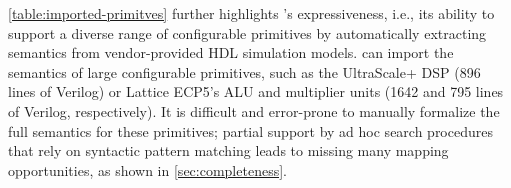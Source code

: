 \cref{table:imported-primitves} further
  highlights \lr's expressiveness,
  i.e., its ability to support a diverse
  range of configurable primitives
  by automatically extracting semantics from
  vendor-provided HDL simulation models.
\lr can import the semantics
  of large configurable primitives, 
  such as the UltraScale+ DSP (896 lines of Verilog)
  or Lattice ECP5's ALU and multiplier units (1642 and
  795 lines of Verilog, respectively).
It is difficult and error-prone
  to manually formalize the full semantics for these primitives;
  partial support by ad hoc search procedures
  that rely on syntactic pattern matching
  leads to missing many mapping opportunities,
  as shown in \cref{sec:completeness}.





